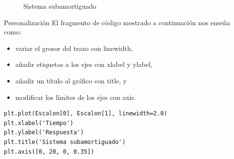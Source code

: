 \documentclass[10pt]{beamer}
\begin{document}
\begin{frame}
	\begin{figure}
		\caption{Sistema subamortiguado}
	\end{figure}
\end{frame}

\begin{frame}[fragile]{Personalización}
	El fragmento de código mostrado a continuación nos enseña como:
	\begin{itemize}
		\item variar el grosor del trazo con \alert{linewidth},
		\item añadir etiquetas a los ejes con \alert{xlabel} y \alert{ylabel},
		\item añadir un título al gráfico con \alert{title}, y
		\item modificar los límites de los ejes con \alert{axis}.
	\end{itemize}
	\begin{verbatim}
plt.plot(Escalon[0], Escalon[1], linewidth=2.0)
plt.xlabel('Tiempo')
plt.ylabel('Respuesta')
plt.title('Sistema subamortiguado')
plt.axis([0, 20, 0, 0.35])
	\end{verbatim}
\end{frame}
\end{document}
